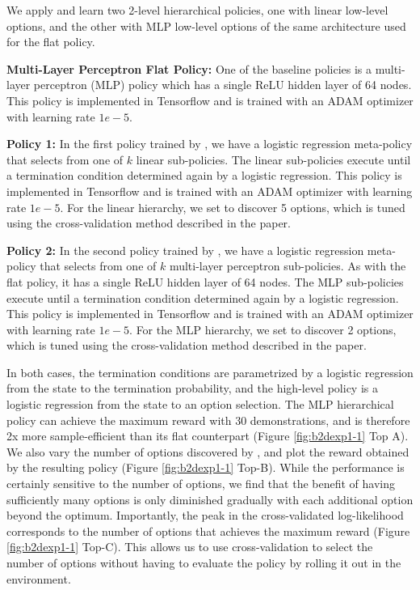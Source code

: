 We apply \alg and learn two 2-level hierarchical policies, one with linear low-level options, and the other with MLP low-level options of the same architecture used for the flat policy. 

\vspace{0.25em}\noindent \textbf{Multi-Layer Perceptron Flat Policy: } One of the baseline policies is a multi-layer perceptron (MLP) policy which has a single ReLU hidden layer of 64 nodes.
This policy is implemented in Tensorflow and is trained with an ADAM optimizer with learning rate $1e-5$.

\vspace{0.25em}\noindent \textbf{\alg Policy 1: } In the first policy trained by \alg, we have a logistic regression meta-policy that selects from one of $k$ linear sub-policies. The linear sub-policies execute until a termination condition determined again by a logistic regression. This policy is implemented in Tensorflow and is trained with an ADAM optimizer with learning rate $1e-5$. For the linear hierarchy, we set \alg to discover 5 options, which is tuned using the cross-validation method described in the paper.

\vspace{0.25em}\noindent \textbf{\alg Policy 2: } In the second policy trained by \alg, we have a logistic regression meta-policy that selects from one of $k$ multi-layer perceptron sub-policies. 
As with the flat policy, it has a single ReLU hidden layer of 64 nodes.
The MLP sub-policies execute until a termination condition determined again by a logistic regression. This policy is implemented in Tensorflow and is trained with an ADAM optimizer with learning rate $1e-5$. For the MLP hierarchy, we set \alg to discover 2 options, which is tuned using the cross-validation method described in the paper.

In both cases, the termination conditions are parametrized by a logistic regression from the state to the termination probability, and the high-level policy is a logistic regression from the state to an option selection.
The MLP hierarchical policy can achieve the maximum reward with  30 demonstrations, and is therefore 2x more sample-efficient than its flat counterpart (Figure \ref{fig:b2dexp1-1} Top A).
We also vary the number of options discovered by \alg, and plot the reward obtained by the resulting policy (Figure \ref{fig:b2dexp1-1} Top-B). While the performance is certainly sensitive to the number of options, we find that the benefit of having sufficiently many options is only diminished gradually with each additional option beyond the optimum. Importantly, the peak in the cross-validated log-likelihood corresponds to the number of options that achieves the maximum reward (Figure \ref{fig:b2dexp1-1} Top-C). This allows us to use cross-validation to select the number of options without having to evaluate the policy by rolling it out in the environment.

